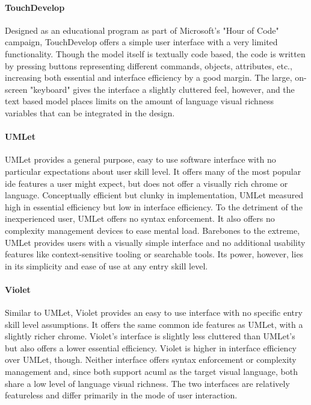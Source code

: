 \paragraph{TouchDevelop} Designed as an educational program as part of
Microsoft's "Hour of Code" campaign, TouchDevelop offers a simple user
interface with a very limited functionality. Though the model itself is
textually code based, the code is written by pressing buttons representing
different commands, objects, attributes, etc., increasing both essential
and interface efficiency by a good margin. The large, on-screen "keyboard"
gives the interface a slightly cluttered feel, however, and the text based
model places limits on the amount of language visual richness variables
that can be integrated in the design.

\paragraph{UMLet} UMLet provides a general purpose, easy to use software
interface with no particular expectations about user skill level. It offers
many of the most popular \ac{ide} features a user might expect, but does
not offer a visually rich chrome or language. Conceptually efficient but
clunky in implementation, UMLet measured high in essential efficiency but
low in interface efficiency. To the detriment of the inexperienced user,
UMLet offers no syntax enforcement. It also offers no complexity management
devices to ease mental load. Barebones to the extreme, UMLet provides users
with a visually simple interface and no additional usability features like
context-sensitive tooling or searchable tools. Its power, however, lies in
its simplicity and ease of use at any entry skill level.

\paragraph{Violet} Similar to UMLet, Violet provides an easy to use
interface with no specific entry skill level assumptions. It offers the
same common \ac{ide} features as UMLet, with a slightly richer chrome.
Violet's interface is slightly less cluttered than UMLet's but also offers
a lower essential efficiency. Violet is higher in interface efficiency over
UMLet, though. Neither interface offers syntax enforcement or complexity
management and, since both support ac{uml} as the target visual language, both
share a low level of language visual richness. The two interfaces are
relatively featureless and differ primarily in the mode of user
interaction.

